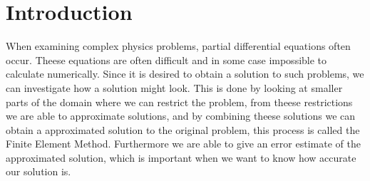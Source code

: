 \section{Introduction}
When examining complex physics problems, partial differential equations often occur. Theese equations are often difficult and in some case impossible to calculate numerically.
Since it is desired to obtain a solution to such problems, we can investigate how a solution might look. This is done by looking at smaller parts of the domain where we can restrict the problem,
from theese restrictions we are able to approximate solutions, and by combining theese solutions we can obtain a approximated solution to the original problem, this process is called the Finite Element Method.
Furthermore we are able to give an error estimate of the approximated solution, which is important when we want to know how accurate our solution is.